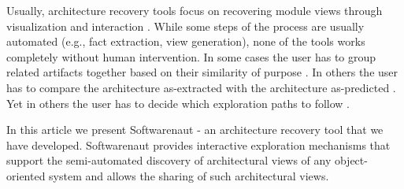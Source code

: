 \documentclass[preprint,12pt]{elsarticle}
\begin{document}
Usually, architecture recovery tools focus on recovering module views through visualization and interaction \cite{murphy-reflexion, muller-rigi, storey-shrimp}. While some steps of the process are usually automated (e.g., fact extraction, view generation), none of the tools works completely without human intervention. In some cases the user has to group related artifacts together based on their similarity of purpose \cite{muller-rigi}. In others the user has to compare the architecture as-extracted with the architecture as-predicted \cite{murphy-reflexion}. Yet in others the user has to decide which exploration paths to follow \cite{storey-shrimp}.







In this article we present Softwarenaut - an architecture recovery tool that we have developed. Softwarenaut provides interactive exploration mechanisms that support the semi-automated discovery of architectural views of any object-oriented system and allows the sharing of such architectural views. 
\end{document}
